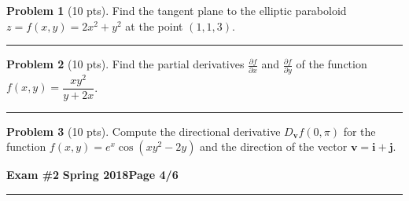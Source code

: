 \documentclass[12pt]{article}
\theoremstyle{definition}
\newtheorem{problem}{Problem}
\begin{document}
\bigskip
\begin{problem}[10 pts] 
Find the tangent plane to the elliptic paraboloid
$z=f(x,y)=2x^2+y^2$ at the point $(1,1,3)$.
\vspace{5cm}
\begin{flushright}
\end{flushright}
\end{problem}
\hrule
\begin{problem}[10 pts] Find the partial derivatives $\frac{\partial f}{\partial x}$ and $\frac{\partial f}{\partial y}$ of the function $f(x,y) = \dfrac{xy^2}{y+2x}$.
\vspace{4.5cm}
\begin{flushright}
\end{flushright}
\end{problem}
\hrule
\begin{problem}[10 pts]
Compute the directional derivative $D_{\boldsymbol{v}}f(0,\pi)$ for the function $f(x,y) = e^x \cos(xy^2-2y)$ and the direction of the vector $\boldsymbol{v} = \boldsymbol{i} + \boldsymbol{j}$.
\vspace{5cm}
\begin{flushright}
\end{flushright}
\end{problem}
\newpage

\hfill{\large\bf Exam \#2}\hfill{\large\bf
  Spring 2018}\hfill{\large\bf Page 4/6}\hrule
\end{document}
